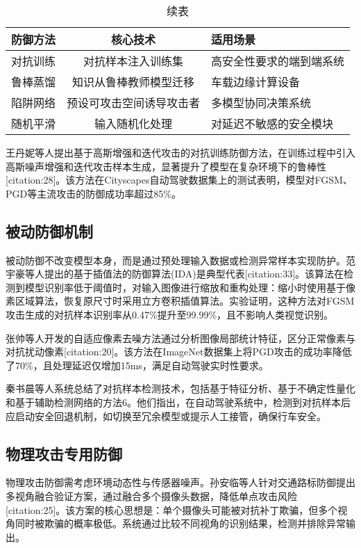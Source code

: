 \documentclass[acmtog]{ctexart}
\begin{document}
\begin{table}
  \caption{续表}
  \label{tab:freq}
  \begin{tabular}{ccl}
    \toprule
    防御方法&核心技术&适用场景\\
    \midrule
    对抗训练&对抗样本注入训练集&高安全性要求的端到端系统\\
    鲁棒蒸馏&知识从鲁棒教师模型迁移&车载边缘计算设备\\
    陷阱网络&预设可攻击空间诱导攻击者&多模型协同决策系统\\
    随机平滑&输入随机化处理&对延迟不敏感的安全模块\\
  \bottomrule
\end{tabular}
\end{table}

王丹妮等人提出基于高斯增强和迭代攻击的对抗训练防御方法，在训练过程中引入高斯噪声增强和迭代攻击样本生成，显著提升了模型在复杂环境下的鲁棒性[citation:28]。该方法在Cityscapes自动驾驶数据集上的测试表明，模型对FGSM、PGD等主流攻击的防御成功率超过85\%。

\subsection{被动防御机制}

被动防御不改变模型本身，而是通过预处理输入数据或检测异常样本实现防护。范宇豪等人提出的基于插值法的防御算法(IDA)是典型代表[citation:33]。该算法在检测到模型识别率低于阈值时，对输入图像进行缩放和重构处理：缩小时使用基于像素区域算法，恢复原尺寸时采用立方卷积插值算法。实验证明，这种方法对FGSM攻击生成的对抗样本识别率从0.47\%提升至99.99\%，且不影响人类视觉识别。

张帅等人开发的自适应像素去噪方法通过分析图像局部统计特征，区分正常像素与对抗扰动像素[citation:20]。该方法在ImageNet数据集上将PGD攻击的成功率降低了70\%，且处理延迟仅增加15ms，满足自动驾驶实时性要求。

秦书晨等人系统总结了对抗样本检测技术，包括基于特征分析、基于不确定性量化和基于辅助检测网络的方法6。他们指出，在自动驾驶系统中，检测到对抗样本后应启动安全回退机制，如切换至冗余模型或提示人工接管，确保行车安全。

\subsection{物理攻击专用防御}

物理攻击防御需考虑环境动态性与传感器噪声。孙安临等人针对交通路标防御提出多视角融合验证方案，通过融合多个摄像头数据，降低单点攻击风险[citation:25]。该方案的核心思想是：单个摄像头可能被对抗补丁欺骗，但多个视角同时被欺骗的概率极低。系统通过比较不同视角的识别结果，检测并排除异常输出。
\end{document}
